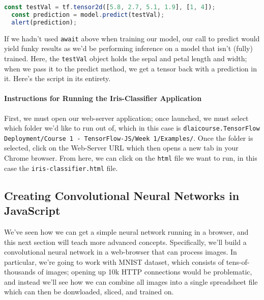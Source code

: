 \documentclass[12pt]{article}
\begin{document}
\begin{lstlisting}[language=JavaScript]
  const testVal = tf.tensor2d([5.8, 2.7, 5.1, 1.9], [1, 4]);
  const prediction = model.predict(testVal);
  alert(prediction);
\end{lstlisting}

If we hadn't used \texttt{await} above when training our model, our call to predict would yield funky results as we'd be performing inference on a model that isn't (fully) trained. 
Here, the \texttt{testVal} object holds the sepal and petal length and width; when we pass it to the predict method, we get a tensor back with a prediction in it. Here's the script in its entirety.



\paragraph{Instructions for Running the Iris-Classifier Application} First, we must open our web-server application; once launched, we must select which folder we'd like to run out of, which in this case is \texttt{dlaicourse.TensorFlow Deployment/Course 1 - TensorFlow-JS/Week 1/Examples/}. Once the folder is selected, click on the Web-Server URL which then opens a new tab in your Chrome browser. From here, we can click on the \texttt{html} file we want to run, in this case the \texttt{iris-classifier.html} file.

\subsection{Creating Convolutional Neural Networks in JavaScript} We've seen how we can get a simple neural network running in a browser, and this next section will teach more advanced concepts. Specifically, we'll build a convolutional neural network in a web-browser that can process images. In particular, we're going to work with MNIST dataset, which consists of tens-of-thousands of images; opening up 10k HTTP connections would be problematic, and instead we'll see how we can combine all images into a single spreadsheet file which can then be donwloaded, sliced, and trained on.
\end{document}

